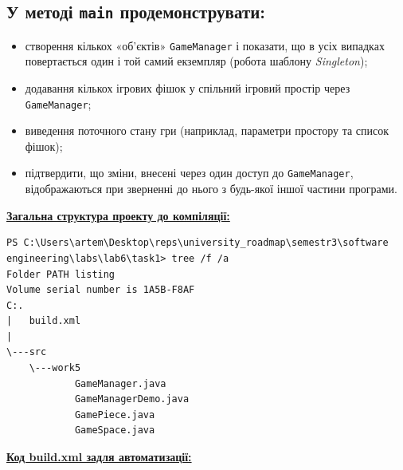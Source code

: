 \documentclass[12pt,a4paper]{article}
\begin{document}
    \subsection*{У методі \texttt{main} продемонструвати:}

    \begin{itemize}
        \item створення кількох «об’єктів» \texttt{GameManager} і показати, 
        що в усіх випадках повертається один і той самий екземпляр 
        (робота шаблону \textit{Singleton});
        \item додавання кількох ігрових фішок у спільний ігровий простір 
        через \texttt{GameManager};
        \item виведення поточного стану гри 
        (наприклад, параметри простору та список фішок);
        \item підтвердити, що зміни, внесені через один доступ 
        до \texttt{GameManager}, відображаються при зверненні до нього 
        з будь-якої іншої частини програми.
    \end{itemize}

    \setlength{\parindent}{0em}

    \textbf{\underline{Загальна структура проекту до компіляції:}}

    \begin{verbatim}
PS C:\Users\artem\Desktop\reps\university_roadmap\semestr3\software engineering\labs\lab6\task1> tree /f /a
Folder PATH listing
Volume serial number is 1A5B-F8AF
C:.
|   build.xml
|   
\---src
    \---work5
            GameManager.java
            GameManagerDemo.java
            GamePiece.java
            GameSpace.java
    \end{verbatim}

    \textbf{\underline{Код build.xml задля автоматизації:}}
\end{document}

